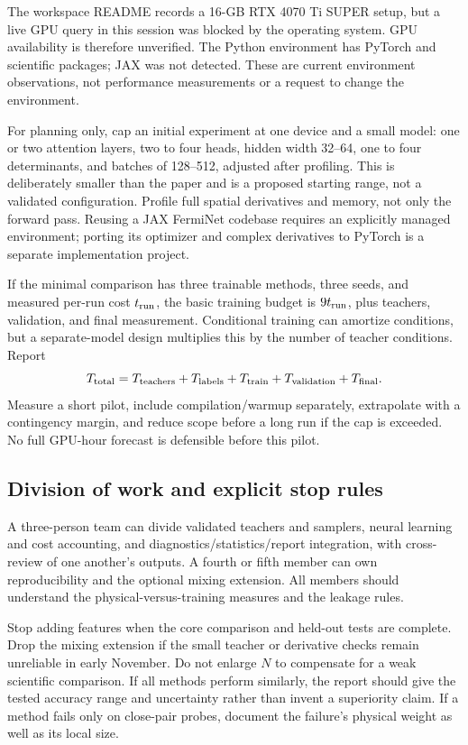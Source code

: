 \documentclass[11pt,letterpaper]{article}
\begin{document}
The workspace README records a 16-GB RTX 4070 Ti SUPER setup, but a live GPU query in this session was blocked by the operating system. GPU availability is therefore unverified. The Python environment has PyTorch and scientific packages; JAX was not detected. These are current environment observations, not performance measurements or a request to change the environment.

For planning only, cap an initial experiment at one device and a small model: one or two attention layers, two to four heads, hidden width 32--64, one to four determinants, and batches of 128--512, adjusted after profiling. This is deliberately smaller than the paper and is a proposed starting range, not a validated configuration. Profile full spatial derivatives and memory, not only the forward pass. Reusing a JAX FermiNet codebase requires an explicitly managed environment; porting its optimizer and complex derivatives to PyTorch is a separate implementation project.

If the minimal comparison has three trainable methods, three seeds, and measured per-run cost $t_{\rm run}$, the basic training budget is $9t_{\rm run}$, plus teachers, validation, and final measurement. Conditional training can amortize conditions, but a separate-model design multiplies this by the number of teacher conditions. Report
\begin{equation}
 T_{\rm total}=T_{\rm teachers}+T_{\rm labels}+T_{\rm train}+T_{\rm validation}+T_{\rm final}.
\end{equation}
Measure a short pilot, include compilation/warmup separately, extrapolate with a contingency margin, and reduce scope before a long run if the cap is exceeded. No full GPU-hour forecast is defensible before this pilot.

\subsection{Division of work and explicit stop rules}

A three-person team can divide validated teachers and samplers, neural learning and cost accounting, and diagnostics/statistics/report integration, with cross-review of one another's outputs. A fourth or fifth member can own reproducibility and the optional mixing extension. All members should understand the physical-versus-training measures and the leakage rules.

Stop adding features when the core comparison and held-out tests are complete. Drop the mixing extension if the small teacher or derivative checks remain unreliable in early November. Do not enlarge $N$ to compensate for a weak scientific comparison. If all methods perform similarly, the report should give the tested accuracy range and uncertainty rather than invent a superiority claim. If a method fails only on close-pair probes, document the failure's physical weight as well as its local size.
\end{document}
